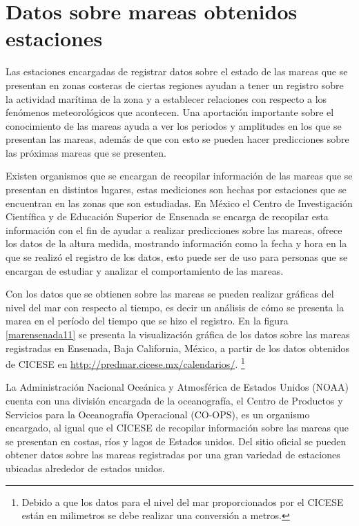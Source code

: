 \pagebreak

\newpage

\section{Datos sobre mareas obtenidos estaciones}

Las estaciones encargadas de registrar datos sobre el estado de las mareas que se presentan en zonas costeras de ciertas regiones ayudan a tener un registro sobre la actividad marítima de la zona y a establecer relaciones con respecto a los fenómenos meteorológicos que acontecen. Una aportación importante sobre el conocimiento de las mareas ayuda a ver los periodos y amplitudes en los que se presentan las mareas, además de que con esto se pueden hacer predicciones sobre las próximas mareas que se presenten.

Existen organismos que se encargan de recopilar información de las mareas que se presentan en distintos lugares, estas mediciones son hechas por estaciones que se encuentran en las zonas que son estudiadas. En México el Centro de Investigación Científica y de Educación Superior de Ensenada se encarga de recopilar esta información con el fin de ayudar a realizar predicciones sobre las mareas, ofrece los datos de la altura medida, mostrando información como la fecha y hora en la que se realizó el registro de los datos, esto puede ser de uso para personas que se encargan de estudiar y analizar el comportamiento de las mareas.

Con los datos que se obtienen sobre las mareas se pueden realizar gráficas del nivel del mar con respecto al tiempo, es decir un análisis de cómo se presenta la marea en el período del tiempo que se hizo el registro. En la figura \ref{marensenada11} se presenta la visualización gráfica de los datos sobre las mareas registradas en Ensenada, Baja California, México, a partir de los datos obtenidos de CICESE en \url{http://predmar.cicese.mx/calendarios/}. \footnotesize\footnote{Debido a que los datos para el nivel del mar proporcionados por el CICESE están en milimetros se debe realizar una conversión a metros.}

La Administración Nacional Oceánica y Atmosférica de Estados Unidos (NOAA) cuenta con una división encargada de la oceanografía, el Centro de Productos y Servicios para la Oceanografía Operacional (CO-OPS), es un organismo encargado, al igual que el CICESE de recopilar información sobre las mareas que se presentan en costas, ríos y lagos de Estados unidos. Del sitio oficial se pueden obtener datos sobre las mareas registradas por una gran variedad de estaciones ubicadas alrededor de estados unidos.


